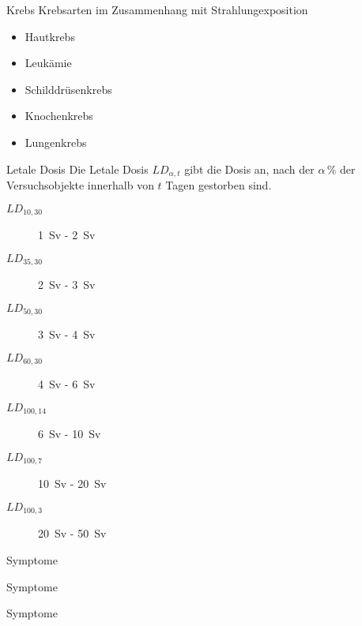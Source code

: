 \begin{frame}{Krebs}
	Krebsarten im Zusammenhang mit Strahlungexposition
\begin{itemize}
	\item Hautkrebs
	\item Leukämie
	\item Schilddrüsenkrebs
	\item Knochenkrebs
	\item Lungenkrebs
\end{itemize}
\end{frame}
\begin{frame}{Letale Dosis}
	Die Letale Dosis $LD_{\alpha ,t}$ gibt die Dosis an, nach der $\alpha \, \%$ der Versuchsobjekte innerhalb von $t$ Tagen gestorben sind.
	\begin{description}
		\item[$LD_{10,30}$] \SI{1}{\sievert} - \SI{2}{\sievert}
		\item[$LD_{35,30}$] \SI{2}{\sievert} - \SI{3}{\sievert}
		\item[$LD_{50,30}$] \SI{3}{\sievert} - \SI{4}{\sievert}
		\item[$LD_{60,30}$] \SI{4}{\sievert} - \SI{6}{\sievert}
		\item[$LD_{100,14}$] \SI{6}{\sievert} - \SI{10}{\sievert}
		\item[$LD_{100,7}$] \SI{10}{\sievert} - \SI{20}{\sievert}
		\item[$LD_{100,3}$] \SI{20}{\sievert} - \SI{50}{\sievert}
	\end{description}
\end{frame}
\begin{frame}{Symptome}
	
\end{frame}
\begin{frame}{Symptome}
	
\end{frame}
\begin{frame}{Symptome}
	
\end{frame}

